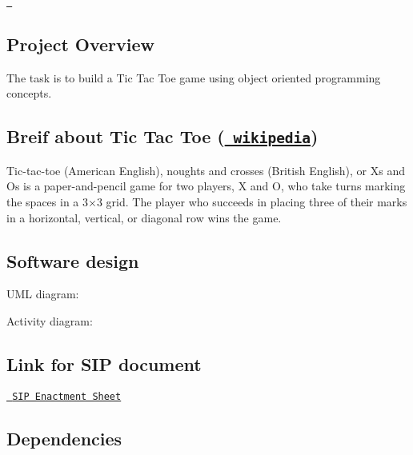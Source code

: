 \href{https://travis-ci.com/ajeetwankhede/Tic-Tac-Toe}\texttt{ } 



\subsection*{Project Overview}

The task is to build a Tic Tac Toe game using object oriented programming concepts.

\subsection*{Breif about Tic Tac Toe (\href{https://en.wikipedia.org/wiki/Tic-tac-toe}\texttt{ wikipedia})}

Tic-\/tac-\/toe (American English), noughts and crosses (British English), or Xs and Os is a paper-\/and-\/pencil game for two players, X and O, who take turns marking the spaces in a 3×3 grid. The player who succeeds in placing three of their marks in a horizontal, vertical, or diagonal row wins the game.

 

\subsection*{Software design}


\begin{DoxyEnumerate}
\item U\+ML diagram\+:
\end{DoxyEnumerate}

 


\begin{DoxyEnumerate}
\item Activity diagram\+:
\end{DoxyEnumerate}

 

\subsection*{Link for S\+IP document}

\href{https://docs.google.com/spreadsheets/d/1osaNjtBZ5rFgGtWi5gnai63RkGZE8U25gTj9zXKbLFg/edit#gid=0}\texttt{ S\+IP Enactment Sheet}

\subsection*{Dependencies}

